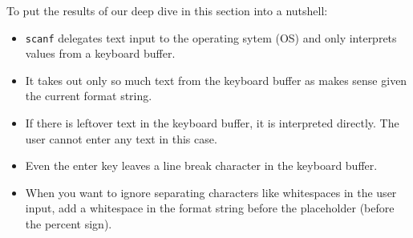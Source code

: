 \begin{defbox}
To put the results of our deep dive in this section into a nutshell:
\begin{itemize}
\item \texttt{scanf} delegates text input to the operating sytem (OS) and only interprets values from a keyboard buffer.
\item It takes out only so much text from the keyboard buffer as makes sense given the current format string.
\item If there is leftover text in the keyboard buffer, it is interpreted directly. The user cannot enter any text in this case.
\item Even the enter key leaves a line break character in the keyboard buffer.
\item When you want to ignore separating characters like whitespaces in the user input, add a whitespace in the format string before the placeholder (before the percent sign).
\end{itemize}
\end{defbox}

